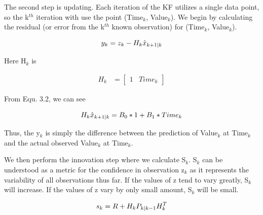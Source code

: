  The second step is updating. Each iteration of the KF utilizes a single data point, so the k$^{th}$ iteration with use the point (Time$_{k}$, Value$_{k}$). We begin by calculating the residual (or error from the k$^{th}$ known observation) for (Time$_{k}$, Value$_{k}$).
  
  \begin{equation}
  \centering
  y_{k} = z_{k} - H_{k}\hat{x}_{k+1|k}
  \end{equation}
  
  Here H$_{k}$ is
  
  \begin{align}
    H_{k} &= \begin{bmatrix}
           1&Time_{k}
         \end{bmatrix}
  \end{align}
  
  From Equ. 3.2, we can see 
  
  \begin{equation}
  \centering
H_{k}\hat{x}_{k+1|k} = B_{0}*1 + B_{1}*Time_{k}
  \end{equation}
  
  Thus, the y$_{k}$ is simply the difference between the prediction of Value$_{k}$ at Time$_{k}$ and the actual observed Value$_{k}$ at Time$_{k}$.
  
  We then perform the innovation step where we calculate S$_{k}$. S$_{k}$ can be understood as a metric for the confidence in observation z$_{k}$ as it represents the variability of all observations thus far. If the values of z tend to vary greatly, S$_{k}$ will increase. If the values of z vary by only small amount, S$_{k}$ will be small.
  
  \begin{equation}
  \centering
s_{k} = R + H_{k}P_{k|k-1}H_{k}^{T}
  \end{equation}
